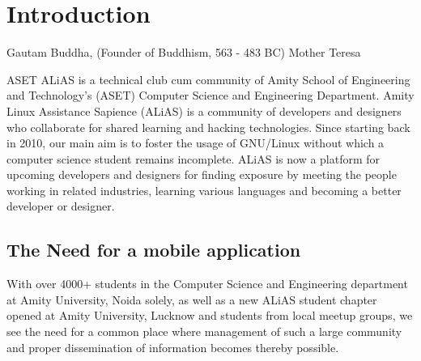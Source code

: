 \chapter{Introduction}
\begin{epigraphs}
%
      {Gautam Buddha, (Founder of Buddhism, 563 - 483 BC)}
%
      {Mother Teresa}
\end{epigraphs}      

ASET ALiAS is a technical club cum community of Amity School of Engineering and Technology's (ASET) Computer Science and Engineering Department. Amity Linux Assistance Sapience (ALiAS) is a community of developers and designers who collaborate for shared learning and hacking technologies. Since starting back in 2010, our main aim is to foster the usage of GNU/Linux without which a computer science student remains incomplete. ALiAS is now a platform for upcoming developers and designers for finding exposure by meeting the people working in related industries, learning various languages and becoming a better developer or designer. \par

\section{The Need for a mobile application}

With over 4000+ students in the Computer Science and Engineering department at Amity University, Noida solely, as well as a new ALiAS student chapter opened at Amity University, Lucknow and students from local meetup groups, we see the need for a common place where management of such a large community and proper dissemination of information becomes thereby possible. \par


